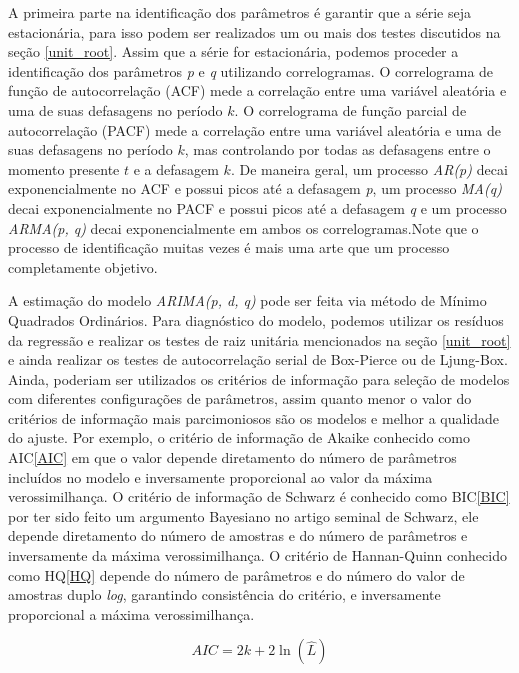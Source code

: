 \documentclass[twocolumn]{rbef}
\newcommand{\1}{\mathbbm{1}}
\begin{document}
A primeira parte na identificação dos parâmetros é garantir que a série seja estacionária, para isso podem ser realizados um ou mais dos testes discutidos na seção \ref{unit_root}. Assim que a série for estacionária, podemos proceder a identificação dos parâmetros \textit{p} e \textit{q} utilizando correlogramas. O correlograma de função de autocorrelação (ACF) mede a correlação entre uma variável aleatória e uma de suas defasagens no período $k$. O correlograma de função parcial de autocorrelação (PACF) mede a correlação entre uma variável aleatória e uma de suas defasagens no período $k$, mas controlando por todas as defasagens entre o momento presente $t$ e a defasagem $k$. De maneira geral, um processo \textit{AR(p)} decai exponencialmente no ACF e possui picos até a defasagem \textit{p}, um processo \textit{MA(q)} decai exponencialmente no PACF e possui picos até a defasagem \textit{q} e um processo \textit{ARMA(p, q)} decai exponencialmente em ambos os correlogramas.Note que o processo de identificação muitas vezes é mais uma arte que um processo completamente objetivo\cite{Enders}.

A estimação do modelo \textit{ARIMA(p, d, q)} pode ser feita via método de Mínimo Quadrados Ordinários. Para diagnóstico do modelo, podemos utilizar os resíduos da regressão e realizar os testes de raiz unitária mencionados na seção \ref{unit_root} e ainda realizar os testes de autocorrelação serial de Box-Pierce\cite{Box-Pierce} ou de Ljung-Box\cite{Ljung-Box}. Ainda, poderiam ser utilizados os critérios de informação para seleção de modelos com diferentes configurações de parâmetros, assim quanto menor o valor do critérios de informação mais parcimoniosos são os modelos e melhor a qualidade do ajuste. Por exemplo, o critério de informação de Akaike\cite{Akaike} conhecido como AIC\ref{AIC} em que o valor depende diretamento do número de parâmetros incluídos no modelo e inversamente proporcional ao valor da máxima verossimilhança. O critério de informação de Schwarz\cite{Schwarz} é conhecido como BIC\ref{BIC} por ter sido feito um argumento Bayesiano no artigo seminal de Schwarz, ele depende diretamento do número de amostras e do número de parâmetros e inversamente da máxima verossimilhança. O critério de Hannan-Quinn\cite{Hannan} conhecido como HQ\ref{HQ} depende do número de parâmetros e do número do valor de amostras duplo \textit{log}, garantindo consistência do critério, e inversamente proporcional a máxima verossimilhança.

\begin{equation} \label{AIC}
    AIC = 2k + 2 \ln (\hat{L})
\end{equation}
\end{document}

